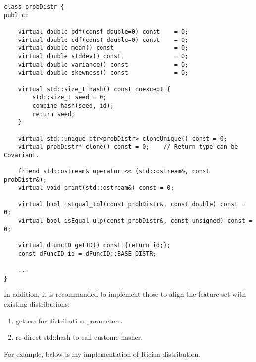 \begin{verbatim}
class probDistr {
public:

    virtual double pdf(const double=0) const    = 0;
    virtual double cdf(const double=0) const    = 0;
    virtual double mean() const                 = 0;
    virtual double stddev() const               = 0;
    virtual double variance() const             = 0;
    virtual double skewness() const             = 0;
    
    virtual std::size_t hash() const noexcept {
        std::size_t seed = 0;
        combine_hash(seed, id);
        return seed;
    }

    virtual std::unique_ptr<probDistr> cloneUnique() const = 0;
    virtual probDistr* clone() const = 0;    // Return type can be Covariant.

    friend std::ostream& operator << (std::ostream&, const probDistr&);
    virtual void print(std::ostream&) const = 0;

    virtual bool isEqual_tol(const probDistr&, const double) const = 0;
    virtual bool isEqual_ulp(const probDistr&, const unsigned) const = 0;

    virtual dFuncID getID() const {return id;};
    const dFuncID id = dFuncID::BASE_DISTR;

    ...
}
\end{verbatim}


In addition, it is recommanded to implement those to align the feature set with existing distributions:
\begin{enumerate}
    \item getters for distribution parameters.
    \item re-direct std::hash to call custome hasher.
\end{enumerate}


For example, below is my implementation of Rician distribution.

